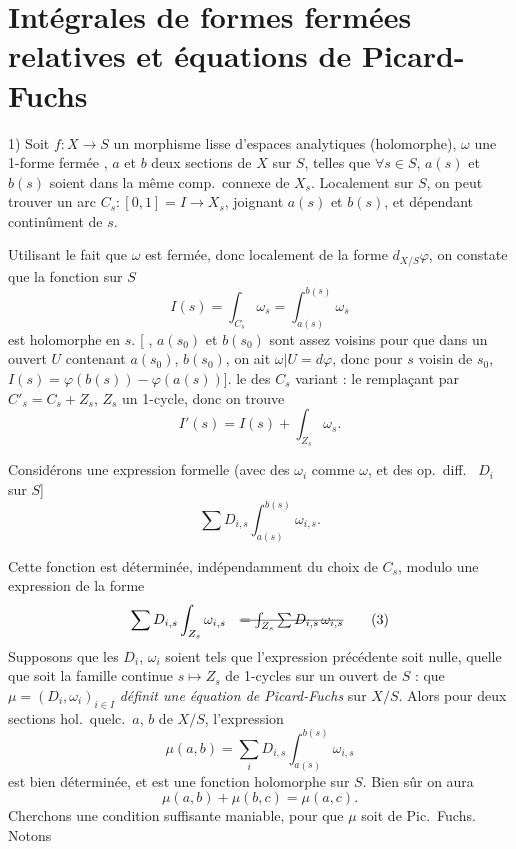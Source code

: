 \documentclass[11pt,a4paper]{article}
\begin{document}
\section{Intégrales de formes fermées relatives et équations de Picard-Fuchs}

1) Soit $f : X \to S$ un morphisme lisse d'espaces analytiques \add{[lisses]}
(holomorphe), $\omega$ une 1-forme fermée , $a$ et $b$
deux sections  de $X$ sur $S$, telles que $\forall s \in S$,
$a(s)$ et $b(s)$ soient dans la même comp.\ connexe de $X_s$. Localement sur
$S$, on peut trouver un arc  
$C_s : [0,1] = I \to X_s$, joignant $a(s)$ et $b(s)$, et dépendant
continûment de $s$.

Utilisant le fait que $\omega$ est fermée, donc localement de la forme
$d_{X/S}\varphi$, on constate que la fonction sur $S$
\[
  I(s) = \int_{C_s} \omega_s = \int_{a(s)}^{b(s)} \omega_s
\]
est holomorphe en $s$. [ ,  \ill{} \ill{} 
$a(s_0)$ et $b(s_0)$ sont assez voisins pour que dans un ouvert $U$ contenant
$a(s_0)$, $b(s_0)$, on ait $\omega|U = d\varphi$, donc pour $s$ voisin de
$s_0$, $I(s) = \varphi(b(s)) - \varphi(a(s))$].
 le \ill{} des $C_s$ variant : le remplaçant par
$C'_s = C_s + Z_s$, $Z_s$ un 1-cycle, donc on trouve
\[
  I'(s) = I(s) + \int_{Z_s} \omega_s . \tag{1}
\]

Considérons une expression formelle (avec des $\omega_i$ comme $\omega$, et des
op.\ diff.\  $D_i$ sur $S$]
\[
  \sum D_{i,s} \int_{a(s)}^{b(s)} \omega_{i,s} . \tag{2}
\]

Cette fonction est déterminée, indépendamment du choix de $C_s$, modulo une
expression de la forme
\[
  \sum D_{i,s} \int_{Z_s} \omega_{i,s}
  \quad \text{\struck{$= \int_{Z_s} \sum D_{i,s}\, \omega_{i,s}$}} \tag{3}
\]
\struck{[N.B. Le fait que $Z_s$ est un 1-cycle permet}
Supposons que les $D_i$, $\omega_i$ soient tels que l'expression précédente
soit nulle, quelle que soit la famille continue $s \mapsto Z_s$ de 1-cycles
\struck{$\Sigma$}  sur un ouvert de $S$ :
  que 
$\mu = (D_i, \omega_i)_{i \in I}$ \emph{définit une équation de Picard-Fuchs}
sur $X/S$. Alors pour deux sections hol.\ quelc.\ $a$, $b$ de $X/S$,
l'expression
\[
  \mu(a,b) = \sum_i D_{i,s} \int_{a(s)}^{b(s)} \omega_{i,s} \tag{4}
\]
est bien déterminée, et est une fonction holomorphe sur $S$. Bien sûr on aura
\[
  \mu(a,b) + \mu(b,c) = \mu(a,c) . \tag{5}
\]
Cherchons une condition suffisante maniable, 
 pour que
$\mu$ soit de Pic.\ Fuchs. Notons
\end{document}

